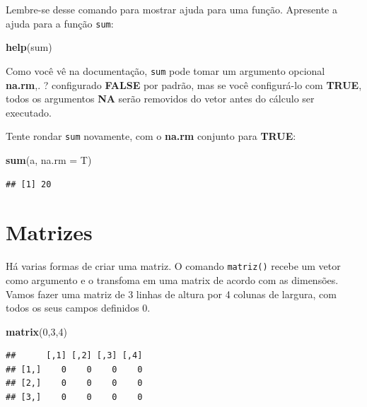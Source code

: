 \documentclass[
]{book}
\newenvironment{Shaded}{\begin{snugshade}}{\end{snugshade}}
\newcommand{\DataTypeTok}[1]{\textcolor[rgb]{0.13,0.29,0.53}{#1}}
\newcommand{\DecValTok}[1]{\textcolor[rgb]{0.00,0.00,0.81}{#1}}
\newcommand{\KeywordTok}[1]{\textcolor[rgb]{0.13,0.29,0.53}{\textbf{#1}}}
\newcommand{\NormalTok}[1]{#1}
\begin{document}
Lembre-se desse comando para mostrar ajuda para uma função. Apresente a ajuda para a função \texttt{sum}:

\begin{Shaded}
\begin{Highlighting}[]
\KeywordTok{help}\NormalTok{(sum)}
\end{Highlighting}
\end{Shaded}

Como você vê na documentação, \texttt{sum} pode tomar um argumento opcional \textbf{na.rm},. ? configurado \textbf{FALSE} por padrão, mas se você configurá-lo com \textbf{TRUE}, todos os argumentos \textbf{NA} serão removidos do vetor antes do cálculo ser executado.

Tente rondar \texttt{sum} novamente, com o \textbf{na.rm} conjunto para \textbf{TRUE}:

\begin{Shaded}
\begin{Highlighting}[]
\KeywordTok{sum}\NormalTok{(a, }\DataTypeTok{na.rm =}\NormalTok{ T)}
\end{Highlighting}
\end{Shaded}

\begin{verbatim}
## [1] 20
\end{verbatim}

\hypertarget{matrizes}{%
\section{Matrizes}\label{matrizes}}

Há varias formas de criar uma matriz. O comando \texttt{matriz()} recebe um vetor como argumento e o transfoma em uma matrix de acordo com as dimensões.
Vamos fazer uma matriz de 3 linhas de altura por 4 colunas de largura, com todos os seus campos definidos 0.

\begin{Shaded}
\begin{Highlighting}[]
\KeywordTok{matrix}\NormalTok{(}\DecValTok{0}\NormalTok{,}\DecValTok{3}\NormalTok{,}\DecValTok{4}\NormalTok{)}
\end{Highlighting}
\end{Shaded}

\begin{verbatim}
##      [,1] [,2] [,3] [,4]
## [1,]    0    0    0    0
## [2,]    0    0    0    0
## [3,]    0    0    0    0
\end{verbatim}
\end{document}
